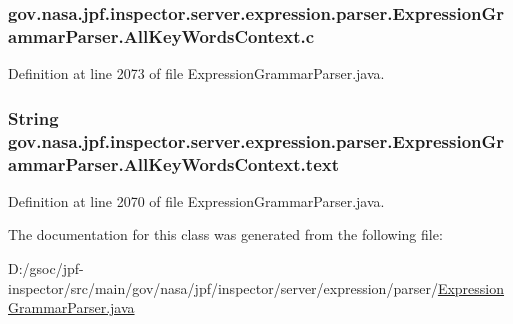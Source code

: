 \subsubsection[{\texorpdfstring{c}{c}}]{ gov.\+nasa.\+jpf.\+inspector.\+server.\+expression.\+parser.\+Expression\+Grammar\+Parser.\+All\+Key\+Words\+Context.\+c}\hypertarget{classgov_1_1nasa_1_1jpf_1_1inspector_1_1server_1_1expression_1_1parser_1_1_expression_grammar_parser_1_1_all_key_words_context_aba54779255d53588d586fe041afe3ab2}{}\label{classgov_1_1nasa_1_1jpf_1_1inspector_1_1server_1_1expression_1_1parser_1_1_expression_grammar_parser_1_1_all_key_words_context_aba54779255d53588d586fe041afe3ab2}


Definition at line 2073 of file Expression\+Grammar\+Parser.\+java.

\subsubsection[{\texorpdfstring{text}{text}}]{\setlength{\rightskip}{0pt plus 5cm}String gov.\+nasa.\+jpf.\+inspector.\+server.\+expression.\+parser.\+Expression\+Grammar\+Parser.\+All\+Key\+Words\+Context.\+text}\hypertarget{classgov_1_1nasa_1_1jpf_1_1inspector_1_1server_1_1expression_1_1parser_1_1_expression_grammar_parser_1_1_all_key_words_context_ad1cc040f529e9b4d5a9695850c7548ef}{}\label{classgov_1_1nasa_1_1jpf_1_1inspector_1_1server_1_1expression_1_1parser_1_1_expression_grammar_parser_1_1_all_key_words_context_ad1cc040f529e9b4d5a9695850c7548ef}


Definition at line 2070 of file Expression\+Grammar\+Parser.\+java.



The documentation for this class was generated from the following file\+:\begin{DoxyCompactItemize}
\item 
D\+:/gsoc/jpf-\/inspector/src/main/gov/nasa/jpf/inspector/server/expression/parser/\hyperlink{_expression_grammar_parser_8java}{Expression\+Grammar\+Parser.\+java}\end{DoxyCompactItemize}
